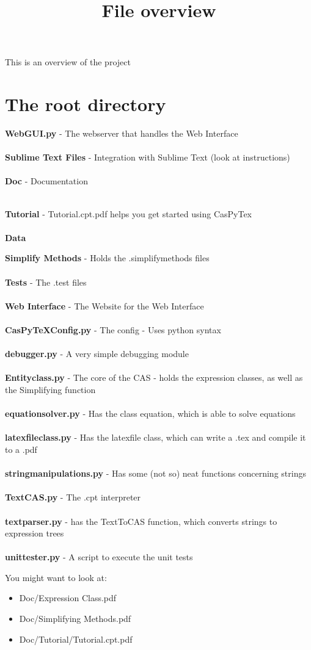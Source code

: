 \documentclass[11pt]{article}
\title{File overview}
\begin{document}
\maketitle\noindent
This is an overview of the project
\section*{The root directory}
\begin{adjustwidth}{1em}{0pt}
\textbf{WebGUI.py} - The webserver that handles the Web Interface
\\\\\textbf{Sublime Text Files} - Integration with Sublime Text (look at instructions)
\\\\\textbf{Doc} - Documentation 
\\\begin{adjustwidth}{1em}{0pt}
\\\textbf{Tutorial} - Tutorial.cpt.pdf helps you get started using CasPyTex
\\\\\textbf{Data}
\\\begin{adjustwidth}{1em}{0pt}
	\textbf{Simplify Methods} - Holds the .simplifymethods files
	\\\\\textbf{Tests} - The .test files
	\\\\\textbf{Web Interface} - The Website for the Web Interface
	\\\\\textbf{CasPyTeXConfig.py} - The config - Uses python syntax
	\\\\\textbf{debugger.py} - A very simple debugging module
	\\\\\textbf{Entityclass.py} - The core of the CAS - holds the expression classes, as well as the Simplifying function
	\\\\\textbf{equationsolver.py} - Has the class equation, which is able to solve equations
	\\\\\textbf{latexfileclass.py} - Has the latexfile class, which can write a .tex and compile it to a .pdf
	\\\\\textbf{stringmanipulations.py} - Has some (not so) neat functions concerning strings
	\\\\\textbf{TextCAS.py} - The .cpt interpreter
	\\\\\textbf{textparser.py} - has the TextToCAS function, which converts strings to expression trees
	\\\\\textbf{unittester.py} - A script to execute the unit tests
\end{adjustwidth}
\end{adjustwidth}
\end{adjustwidth}
You might want to look at:
\begin{itemize}
\item Doc/Expression Class.pdf
\item Doc/Simplifying Methods.pdf
\item Doc/Tutorial/Tutorial.cpt.pdf
\end{itemize}
\end{document}
